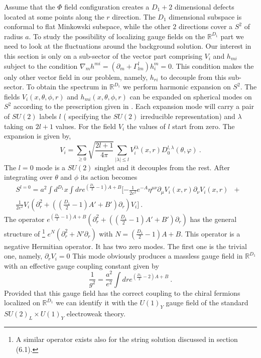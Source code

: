 \documentclass[a4paper,12pt]{article}
\begin{document}
Assume that the $\Phi$ field configuration creates a $D_1+2$
dimensional defects located at some points along the $r$
direction. The $D_1$ dimensional subspace is conformal to flat
Minkowski subspace, while the other $2$ directions cover a $S^2$
of radius $a$. To study the possibility of localizing gauge fields
on the $\mathbb{R}^{D_1}$ part we need to look at the fluctuations
around the background solution. Our interest in this section is
only on a sub-sector of the vector part comprising $V_i$ and
$h_{mi}$ subject to the condition $\nabla _m h^{mi}= (\partial_m
+\Gamma_{lm}^{l} )h^m _i=0$. This condition makes the only other
vector field in our problem, namely, $h_{ri}$ to decouple from
this sub-sector. To obtain the spectrum in $\mathbb{R}^{D_1}$ we
perform harmonic expansion on $S^2$. The fields $V_i(x,
\theta,\phi, r)$ and $h_{mi}(x, \theta,\phi,r)$ can be expanded on
spherical modes on $S^2$ according to the prescription given in
\cite{Randjbar-Daemi:1982hi,Randjbar-Daemi:1983bw}. Each expansion
mode will carry a pair of $SU(2)$ labels $l$ ( specifying the
$SU(2)$ irreducible representation) and $\lambda$ taking on $2l+1$
values. For the field $V_i$ the values of $l$ start from zero. The
expansion is given by,
\begin{equation}
  V_i= \sum_{\geq 0}\sqrt{\frac{2l+1}{4\pi}}\sum_{\mid
  \lambda\mid\leq l} V^{l\lambda}_i (x, r)
  D_0 ^{l,\lambda}(\theta,\varphi)~.
\end{equation}
The $l=0$ mode is a $SU(2)$ singlet and it decouples from the rest.
After integrating over $\theta$ and $\phi$ its action becomes
\begin{eqnarray}
S^{l=0} =  a^2\int d^{D_1}x \int dr
e^{(\frac{D_1}{2}-1)A+B}[-\frac{1}{2e^2}e^{-A }\eta^{\mu\nu}
\partial_\mu V_i(x,r)\partial_\nu V_i(x,r) &+&\\
\frac{1}{2e^2} V_i (\partial_r ^{2} +((\frac{D_1}{2} -1)A'+
B')\partial_r )V_i]~.
\end{eqnarray}
The operator $e^{(\frac{D_1}{2}-1)A+B}\left(\partial_r ^{2}
+\left((\frac{D_1}{2} -1)A'+ B'\right)\partial_r\right)$ has the
general structure  of \footnote{ A similar operator exists also
for the string solution discussed in section (6.1).}
$e^N(\partial_r ^{2} + N'\partial_r)$ with $N=
{(\frac{D_1}{2}-1)A+B}$. This operator is a negative Hermitian
operator.  It has two zero modes. The first one is the trivial
one, namely, $\partial_r V_i=0$ This mode obviously produces a
massless gauge field in $\mathbb{R}^{D_1}$ with an effective gauge
coupling constant given by
\begin{equation}
\frac{1}{g^2}=\frac{a^2}{e^2}\int dr e^{(\frac{D_1}{2}-2)A+B}~.
\end{equation}
Provided that this gauge field has the correct coupling to the chiral
fermions localized on $\mathbb{R}^{D_1}$ we can identify it with the
$U(1)_Y$ gauge field of the standard $SU(2)_L\times U(1)_Y$
electroweak theory.
\end{document}
